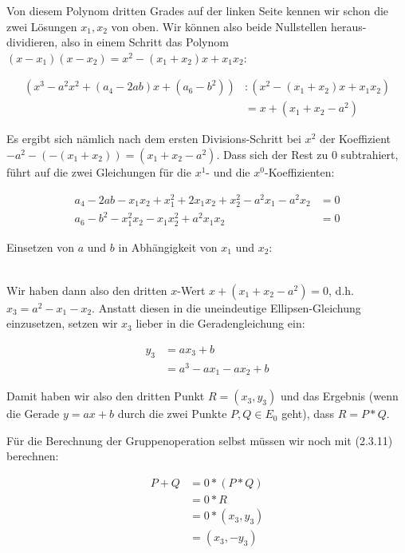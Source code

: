 \begin{enumerate}[label=\alph*)]
Von diesem Polynom dritten Grades auf der linken Seite kennen wir schon die zwei Lösungen $x_{1}, x_{2}$ von oben. Wir können also
beide Nullstellen heraus-dividieren, also in einem Schritt das Polynom $(x-x_{1})(x-x_{2}) = x^{2} - (x_{1}+x_{2})x + x_{1}x_{2}$:

\begin{align*}
(x^{3} - a^{2}x^{2} + (a_{4} - 2ab)x + (a_{6} - b^{2})) &: (x^{2} - (x_{1}+x_{2})x + x_{1}x_{2}) \\
&= x + (x_{1} + x_{2} - a^{2})
\end{align*}

Es ergibt sich nämlich nach dem ersten Divisions-Schritt bei $x^{2}$ der Koeffizient $-a^{2} - (-(x_{1} + x_{2})) = (x_{1} + x_{2} - a^{2})$.
Dass sich der Rest zu $0$ subtrahiert, führt auf die zwei Gleichungen für die $x^{1}$- und die $x^{0}$-Koeffizienten:

\begin{align*}
a_{4} - 2ab - x_{1}x_{2} + x_{1}^{2} + 2x_{1}x_{2} + x_{2}^{2} - a^{2}x_{1} - a^{2}x_{2} &= 0 \\
a_{6} - b^{2} - x_{1}^{2}x_{2} - x_{1}x_{2}^{2} + a^{2}x_{1}x_{2} &= 0
\end{align*}

Einsetzen von $a$ und $b$ in Abhängigkeit von $x_{1}$ und $x_{2}$:

\begin{align*}

\end{align*}

Wir haben dann also den dritten $x$-Wert $x + (x_{1} + x_{2} - a^{2}) = 0$, d.h. $x_{3} = a^{2} - x_{1} - x_{2}$.
Anstatt diesen in die uneindeutige Ellipsen-Gleichung einzusetzen, setzen wir $x_{3}$ lieber in die Geradengleichung ein:

\begin{align*}
y_{3} &= ax_{3} + b \\
&= a^{3} - ax_{1} - ax_{2} + b
\end{align*}

Damit haben wir also den dritten Punkt $R = (x_{3}, y_{3})$ und das Ergebnis (wenn die Gerade $y = ax + b$ durch die zwei Punkte $P, Q \in E_{0}$ geht),
dass $R = P \ast Q$.

Für die Berechnung der Gruppenoperation selbst müssen wir noch mit (2.3.11) berechnen:

\begin{align*}
P + Q &= 0 \ast (P \ast Q) \\
&= 0 \ast R \\
&= 0 \ast (x_{3}, y_{3}) \\
&= (x_{3}, -y_{3})
\end{align*}




\end{enumerate}
